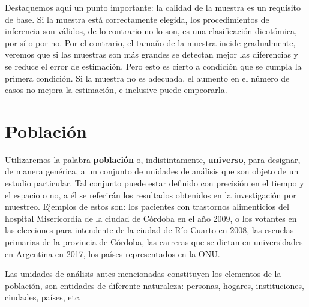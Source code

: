 \documentclass[]{book}
\begin{document}
Destaquemos aquí un punto importante: la calidad de la muestra es un requisito de base. Si la muestra está correctamente elegida, los procedimientos de inferencia son válidos, de lo contrario no lo son, es una clasificación dicotómica, por sí o por no. Por el contrario, el tamaño de la muestra incide gradualmente, veremos que si las muestras son más grandes se detectan mejor las diferencias y se reduce el error de estimación. Pero esto es cierto a condición que se cumpla la primera condición. Si la muestra no es adecuada, el aumento en el número de casos no mejora la estimación, e inclusive puede empeorarla.

\hypertarget{poblaciuxf3n}{%
\section{Población}\label{poblaciuxf3n}}

Utilizaremos la palabra \textbf{población} o, indistintamente, \textbf{universo},
para designar, de manera genérica, a un conjunto de unidades de análisis
que son objeto de un estudio particular. Tal conjunto puede estar
definido con precisión en el tiempo y el espacio o no, a él se referirán
los resultados obtenidos en la investigación por muestreo. Ejemplos de
estos son: los pacientes con trastornos alimenticios del hospital
Misericordia de la ciudad de Córdoba en el año 2009, o los votantes en
las elecciones para intendente de la ciudad de Río Cuarto en 2008, las
escuelas primarias de la provincia de Córdoba, las carreras que se
dictan en universidades en Argentina en 2017, los países representados en la ONU.

Las unidades de análisis antes mencionadas constituyen los elementos de la población, son entidades de diferente naturaleza: personas, hogares, instituciones, ciudades, países, etc.
\end{document}
